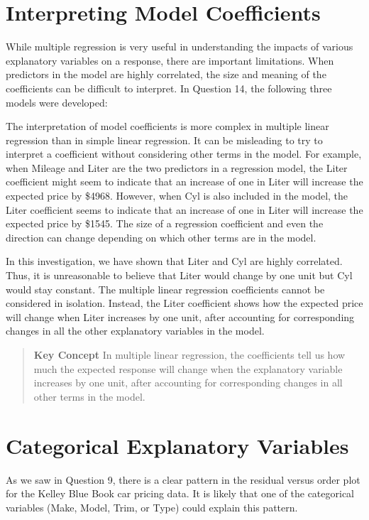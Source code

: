 \documentclass[
]{report}
\begin{document}
\section{Interpreting Model Coefficients}\label{interpreting-model-coefficients}

While multiple regression is very useful in understanding the impacts of various explanatory variables on a response, there are important limitations. When predictors in the model are highly correlated, the size and meaning of the coefficients can be difficult to interpret. In Question 14, the following three models were developed:

The interpretation of model coefficients is more complex in multiple linear regression than in simple linear regression. It can be misleading to try to interpret a coefficient without considering other terms in the model. For example, when Mileage and Liter are the two predictors in a regression model, the Liter coefficient might seem to indicate that an increase of one in Liter will increase the expected price by \$4968. However, when Cyl is also included in the model, the Liter coefficient seems to indicate that an increase of one in Liter will increase the expected price by \$1545. The size of a regression coefficient and even the direction can change depending on which other terms are in the model.

In this investigation, we have shown that Liter and Cyl are highly correlated. Thus, it is unreasonable to believe that Liter would change by one unit but Cyl would stay constant. The multiple linear regression coefficients cannot be considered in isolation. Instead, the Liter coefficient shows how the expected price will change when Liter increases by one unit, after accounting for corresponding changes in all the other
explanatory variables in the model.

\begin{quote}
\textbf{Key Concept}
In multiple linear regression, the coefficients tell us how much the expected response will change when the explanatory variable increases by one unit, after accounting for corresponding changes in all other terms in the model.
\end{quote}

\section{Categorical Explanatory Variables}\label{categorical-explanatory-variables}

As we saw in Question 9, there is a clear pattern in the residual versus order plot for the Kelley Blue Book car pricing data. It is likely that one of the categorical variables (Make, Model, Trim, or Type) could explain this pattern.
\end{document}
